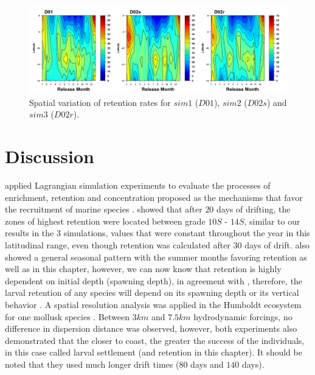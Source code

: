 \begin{center}
\begin{figure}[H]
	\includegraphics[width=1.0\textwidth]{figures/Chap2SpatialVariation.png}
	\centering
	\caption{Spatial variation of retention rates for $sim 1$ ($D01$), $sim 2$ ($D02s$) and $sim 3$ ($D02r$).}
	\label{Chap2SpatialVariation}
\end{figure}
\end{center}

\clearpage
\section{Discussion}\label{Chap2Disc}

\cite{LettPenv2007} applied Lagrangian simulation experiments to evaluate the processes of enrichment, retention and concentration proposed as the mechanisms that favor the recruitment of marine species \citep{Baku1998, Baku2010}. \cite{LettPenv2007} showed that after $20$ days of drifting, the zones of highest retention were located between grade $10$\textdegree $S$ - $14$\textdegree $S$, similar to our results in the $3$ simulations, values that were constant throughout the year in this latitudinal range, even though retention was calculated after $30$ days of drift. \cite{LettPenv2007} also showed a general seasonal pattern with the summer months favoring retention as well as in this chapter, however, we can now know that retention is highly dependent on initial depth (spawning depth), in agreement with \cite{BrocLett2008}, therefore, the larval retention of any species will depend on its spawning depth or its vertical behavior \citep{OspiPara2012}. A spatial resolution analysis was applied in the Humboldt ecosystem for one mollusk species \citep{GaraKapl2014}. Between $3 km$ and $7.5 km$ hydrodynamic forcings, no difference in dispersion distance was observed, however, both experiments also demonstrated that the closer to coast, the greater the success of the individuals, in this case called larval settlement (and retention in this chapter). It should be noted that they used much longer drift times ($80$ days and $140$ days).\\

